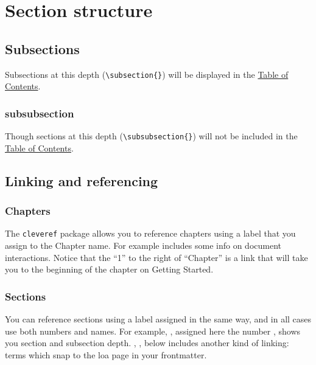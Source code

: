 \documentclass[../../main.tex]{subfiles}  %
\begin{document}
\section{Section structure}\label{sec:struct}

	\subsection{Subsections}

	Subsections at this depth (\verb|\subsection{}|) will be displayed in the \hyperlink{toc}{Table of Contents}.

	\subsubsection{subsubsection}

	Though sections at this depth (\verb|\subsubsection{}|) will not be included in the \hyperlink{toc}{Table of Contents}.

	\subsection{Linking and referencing}

	\subsubsection{Chapters}

	The \texttt{cleveref} package allows you to reference chapters using a label that you assign to the Chapter name. 
	For example  includes some info on document interactions. 
	Notice that the ``1'' to the right of ``Chapter'' is a link that will take you to the beginning of the chapter on Getting Started.

	\subsubsection{Sections}

	You can reference sections using a label assigned in the same way, and in all cases use both numbers and names.
	For example, , assigned here the number , shows you section and subsection depth. 
	, , below includes another kind of linking: terms which snap to the \gls{loa} page in your frontmatter.
\end{document}
